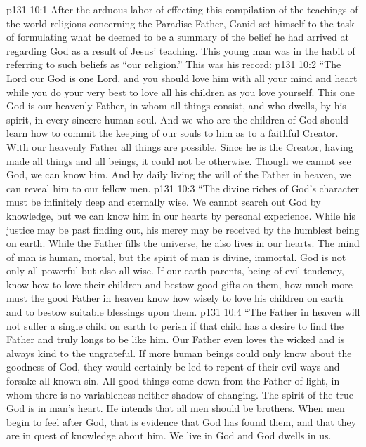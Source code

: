 \vs p131 10:1 After the arduous labor of effecting this compilation of the teachings of the world religions concerning the Paradise Father, Ganid set himself to the task of formulating what he deemed to be a summary of the belief he had arrived at regarding God as a result of Jesus’ teaching. This young man was in the habit of referring to such beliefs as “our religion.” This was his record:
\vs p131 10:2 \pc “The Lord our God is one Lord, and you should love him with all your mind and heart while you do your very best to love all his children as you love yourself. This one God is our heavenly Father, in whom all things consist, and who dwells, by his spirit, in every sincere human soul. And we who are the children of God should learn how to commit the keeping of our souls to him as to a faithful Creator. With our heavenly Father all things are possible. Since he is the Creator, having made all things and all beings, it could not be otherwise. Though we cannot see God, we can know him. And by daily living the will of the Father in heaven, we can reveal him to our fellow men.
\vs p131 10:3 “The divine riches of God’s character must be infinitely deep and eternally wise. We cannot search out God by knowledge, but we can know him in our hearts by personal experience. While his justice may be past finding out, his mercy may be received by the humblest being on earth. While the Father fills the universe, he also lives in our hearts. The mind of man is human, mortal, but the spirit of man is divine, immortal. God is not only all\hyp{}powerful but also all\hyp{}wise. If our earth parents, being of evil tendency, know how to love their children and bestow good gifts on them, how much more must the good Father in heaven know how wisely to love his children on earth and to bestow suitable blessings upon them.
\vs p131 10:4 “The Father in heaven will not suffer a single child on earth to perish if that child has a desire to find the Father and truly longs to be like him. Our Father even loves the wicked and is always kind to the ungrateful. If more human beings could only know about the goodness of God, they would certainly be led to repent of their evil ways and forsake all known sin. All good things come down from the Father of light, in whom there is no variableness neither shadow of changing. The spirit of the true God is in man’s heart. He intends that all men should be brothers. When men begin to feel after God, that is evidence that God has found them, and that they are in quest of knowledge about him. We live in God and God dwells in us.
